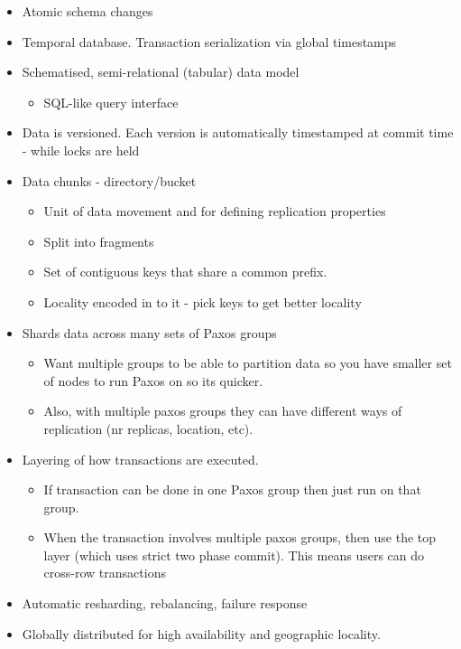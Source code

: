 \begin{itemize}
    \item Atomic schema changes

    \item Temporal database. Transaction serialization via global timestamps

    \item Schematised, semi-relational (tabular) data model
    \begin{itemize}
       \item SQL-like query interface
    \end{itemize}

    \item Data is versioned. Each version is automatically timestamped at commit time - while locks are held

    \item Data chunks - directory/bucket
    \begin{itemize}
        \item Unit of data movement and for defining replication properties
        \item Split into fragments
        \item Set of contiguous keys that share a common prefix.
        \item Locality encoded in to it - pick keys to get better locality
    \end{itemize}

    \item Shards data across many sets of Paxos groups
    \begin{itemize} 
        \item Want multiple groups to be able to partition data so you have smaller set of nodes to run Paxos on so its quicker. 
        \item Also, with multiple paxos groups they can have different ways of replication (nr replicas, location, etc). 
    \end{itemize} 

    \item Layering of how transactions are executed. 
    \begin{itemize} 
        \item If transaction can be done in one Paxos group then just run on that group. 
        \item When the transaction involves multiple paxos groups, then use the top layer (which uses strict two phase commit). This means users can do cross-row transactions 
    \end{itemize}

    \item Automatic resharding, rebalancing, failure response 

    \item Globally distributed for high availability and geographic locality. 

\end{itemize}

